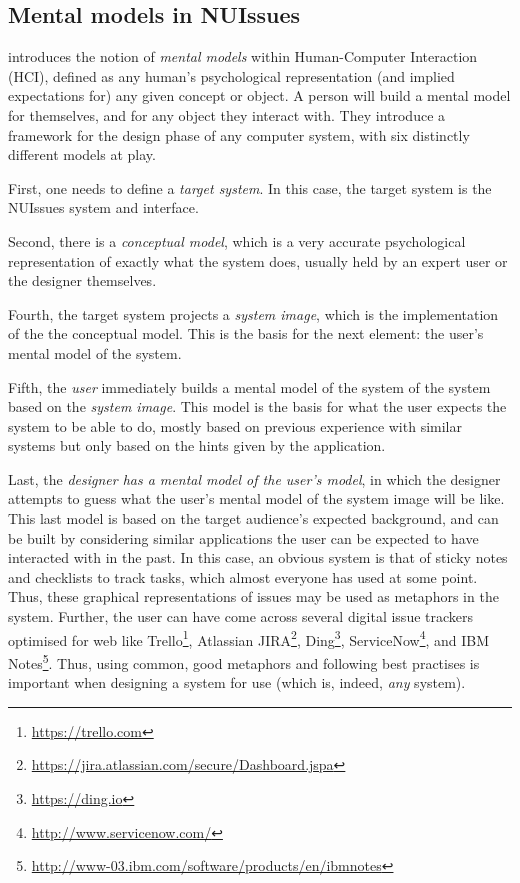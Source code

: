 \subsection{Mental models in NUIssues}

\textcite{wilson-rutherford:mental-models-theory-and-application-in-human-factors:1989} introduces the notion of \textit{mental models} within Human-Computer Interaction (HCI), defined as any human's psychological representation (and implied expectations for) any given concept or object. A person will build a mental model for themselves, and for any object they interact with. They introduce a framework for the design phase of any computer system, with six distinctly different models at play.

First, one needs to define a \textit{target system}. In this case, the target system is the NUIssues system and interface.

Second, there is a \textit{conceptual model}, which is a very accurate psychological representation of exactly what the system does, usually held by an expert user or the designer themselves.

Fourth, the target system projects a \textit{system image}, which is the implementation of the the conceptual model. This is the basis for the next element: the user's mental model of the system.

Fifth, the \textit{user} immediately builds a mental model of the system of the system based on the \textit{system image}. This model is the basis for what the user expects the system to be able to do, mostly based on previous experience with similar systems but only based on the hints given by the application.

Last, the \textit{designer has a mental model of the user's model}, in which the designer attempts to guess what the user's mental model of the system image will be like. This last model is based on the target audience's expected background, and can be built by considering similar applications the user can be expected to have interacted with in the past. In this case, an obvious system is that of sticky notes and checklists to track tasks, which almost everyone has used at some point. Thus, these graphical representations of issues may be used as metaphors in the system. Further, the user can have come across several digital issue trackers optimised for web like Trello\footnote{\url{https://trello.com}}, Atlassian JIRA\footnote{\url{https://jira.atlassian.com/secure/Dashboard.jspa}}, Ding\footnote{\url{https://ding.io}}, ServiceNow\footnote{\url{http://www.servicenow.com/}}, and IBM Notes\footnote{\url{http://www-03.ibm.com/software/products/en/ibmnotes}}. Thus, using common, good metaphors and following best practises is important when designing a system for use (which is, indeed, \textit{any} system).

